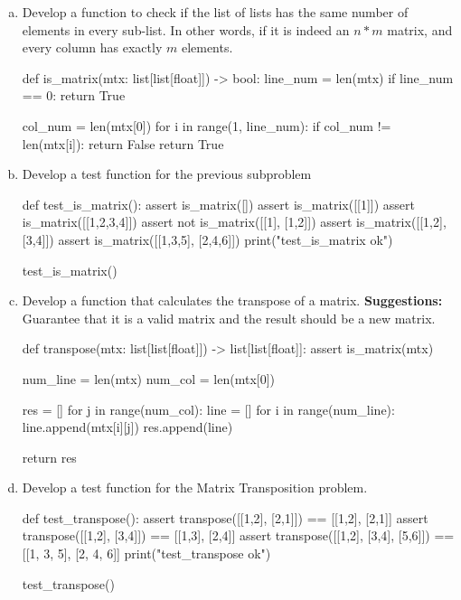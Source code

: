 \documentclass[12pt]{article}
\begin{document}
\begin{enumerate}[a)]
  \item Develop a function to check if the list of lists has the same number of
    elements in every sub-list. In other words, if it is indeed an $n*m$ matrix,
    and every column has exactly $m$ elements.
\begin{pythonlst}
def is_matrix(mtx: list[list[float]]) -> bool:
  line_num = len(mtx)
  if line_num == 0:
    return True

  col_num = len(mtx[0])
  for i in range(1, line_num):
    if col_num != len(mtx[i]):
      return False
  return True
\end{pythonlst}
  \item Develop a test function for the previous subproblem
\begin{pythonlst}
def test_is_matrix():
  assert is_matrix([])
  assert is_matrix([[1]])
  assert is_matrix([[1,2,3,4]])
  assert not is_matrix([[1], [1,2]])
  assert is_matrix([[1,2], [3,4]])
  assert is_matrix([[1,3,5], [2,4,6]])
  print("test_is_matrix ok")

test_is_matrix()
\end{pythonlst}
  \item Develop a function that calculates the transpose of a matrix. 
  \textbf{Suggestions:} Guarantee that it is a valid matrix and the result 
    should be a new matrix.
\begin{pythonlst}
def transpose(mtx: list[list[float]]) -> list[list[float]]:
  assert is_matrix(mtx)
  
  num_line = len(mtx)
  num_col = len(mtx[0])

  res = []
  for j in range(num_col):
    line = []
    for i in range(num_line):
      line.append(mtx[i][j])
    res.append(line)

  return res
\end{pythonlst}
  \item Develop a test function for the Matrix Transposition problem.
\begin{pythonlst}
def test_transpose():
  assert transpose([[1,2], [2,1]]) == [[1,2], [2,1]]
  assert transpose([[1,2], [3,4]]) == [[1,3], [2,4]]
  assert transpose([[1,2], [3,4], [5,6]]) == [[1, 3, 5], [2, 4, 6]]
  print("test_transpose ok")

test_transpose()
\end{pythonlst}
\end{enumerate}
\end{document}
